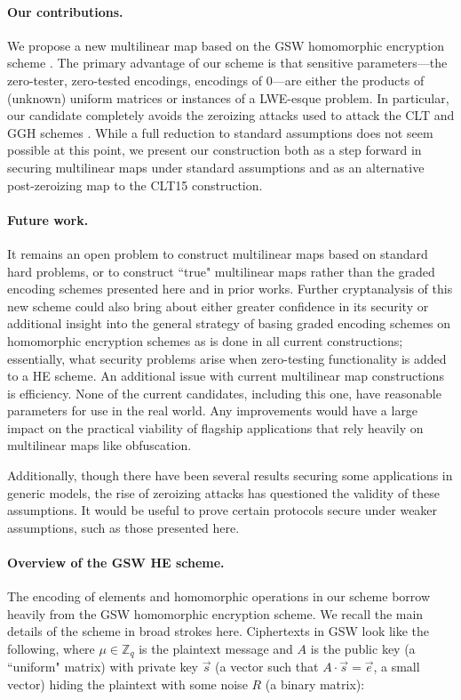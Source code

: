 \paragraph{Our contributions.}  We propose a new multilinear map based on the GSW homomorphic encryption scheme \cite{gsw}.  The primary advantage of our scheme is that sensitive parameters---the zero-tester, zero-tested encodings, encodings of $0$---are either the products of (unknown) uniform matrices or instances of a LWE-esque problem.  In particular, our candidate completely avoids the zeroizing attacks used to attack the CLT and GGH schemes \cite{chl, cgh, hj}.  While a full reduction to standard assumptions does not seem possible at this point, we present our construction both as a step forward in securing multilinear maps under standard assumptions and as an alternative post-zeroizing map to the CLT15 construction.

\paragraph{Future work.}  It remains an open problem to construct multilinear maps based on standard hard problems, or to construct ``true" multilinear maps rather than the graded encoding schemes presented here and in prior works.  Further cryptanalysis of this new scheme could also bring about either greater confidence in its security or additional insight into the general strategy of basing graded encoding schemes on homomorphic encryption schemes as is done in all current constructions; essentially, what security problems arise when zero-testing functionality is added to a HE scheme.  An additional issue with current multilinear map constructions is efficiency.  None of the current candidates, including this one, have reasonable parameters for use in the real world.  Any improvements would have a large impact on the practical viability of flagship applications that rely heavily on multilinear maps like obfuscation.

Additionally, though there have been several results securing some applications in generic models, the rise of zeroizing attacks has questioned the validity of these assumptions.  It would be useful to prove certain protocols secure under weaker assumptions, such as those presented here.

\paragraph{Overview of the GSW HE scheme.}  The encoding of elements and homomorphic operations in our scheme borrow heavily from the GSW homomorphic encryption scheme.  We recall the main details of the scheme in broad strokes here.  Ciphertexts in GSW look like the following, where $\mu \in \mathbb{Z}_q$ is the plaintext message and $A$ is the public key (a ``uniform" matrix) with private key $\vec{s}$ (a vector such that $A\cdot \vec{s} = \vec{e}$, a small vector) hiding the plaintext with some noise $R$ (a binary matrix):

